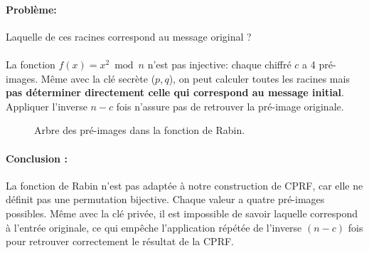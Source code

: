 \documentclass[9pt]{extarticle}
\begin{document}
\paragraph{Problème:}Laquelle de ces racines correspond au message original ?
\paragraph{}
La fonction \(f(x) = x^2 \bmod n\) n'est pas injective: chaque chiffré \(c\) a 4 pré-images.
Même avec la clé secrète (\(p,q\)), on peut calculer toutes les racines mais \textbf{pas déterminer directement celle qui correspond au message initial}.
Appliquer l'inverse \(n-c\) fois n'assure pas de retrouver la pré-image originale.



\begin{figure}[H]
  \centering
{}
\caption{Arbre des pré-images dans la fonction de Rabin.}\label{fig:rabin-tree}
\end{figure}

\paragraph{Conclusion :}
La fonction de Rabin n’est pas adaptée à notre construction de CPRF,
car elle ne définit pas une permutation bijective. Chaque valeur a quatre pré-images possibles. 
Même avec la clé privée, il est impossible de savoir laquelle correspond à l'entrée originale, ce qui empêche 
l'application répétée de l'inverse $(n-c)$ fois pour retrouver correctement le résultat de la CPRF.
\end{document}
